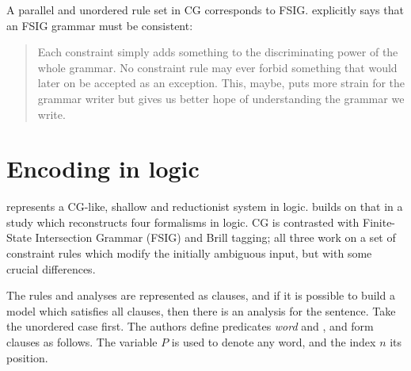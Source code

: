 A parallel and unordered rule set in CG corresponds to FSIG.
\cite{koskenniemi90} explicitly says that an FSIG grammar must be
consistent:
 
 \begin{quote}
 Each constraint simply adds something to the discriminating power of the
 whole grammar. No constraint rule may ever forbid something that would
 later on be accepted as an exception. This, maybe, puts more strain for
 the grammar writer but gives us better hope of understanding the grammar
 we write.
 \end{quote}
 
% 
% 
% 
% 
% 

\section*{Encoding in logic}\label{encoding-in-logic}

\cite{lager98} represents a CG-like, shallow and reductionist system in
logic. \cite{lager_nivre01} builds on that in a study which reconstructs
four formalisms in logic. CG is contrasted with Finite-State
Intersection Grammar (FSIG) and Brill tagging; all three work on a set
of constraint rules which modify the initially ambiguous input, but with some crucial
differences.

The rules and analyses are represented as clauses, and if it is
possible to build a model which satisfies all clauses, then there is
an analysis for the sentence.
Take the unordered case first. The authors define predicates \emph{word}
and \emph{}, and form clauses as follows. The variable $P$ is used to
denote any word, and the index $n$ its position.

